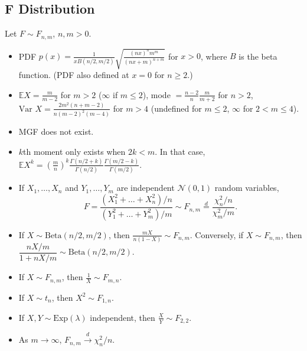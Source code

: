 \documentclass[twoside]{article}
\newcommand\bbE{\mathbb{E}}
\newcommand\calN{\mathcal{N}}
\newcommand\lmb{\lambda}
\newcommand\goesto{\rightarrow}
\newcommand\var{\text{Var }}
\begin{document}
\subsection{F Distribution}
Let $F \sim F_{n,m}$, $n, m > 0$.
\begin{itemize}
\item PDF $p(x) = \displaystyle\frac{1}{x B(n/2, m/2)} \sqrt{\displaystyle\frac{(nx)^n m^m}{(nx +m)^{n+m}}}$ for $x > 0$, where $B$ is the beta function. (PDF also defined at $x = 0$ for $n \geq 2$.)

\item $\bbE X = \displaystyle\frac{m}{m-2}$ for $m > 2$ ($\infty$ if $m \leq 2$), mode $= \displaystyle\frac{n-2}{n}\frac{m}{m+2}$ for $n > 2$, $\var X = \displaystyle\frac{2m^2(n+m-2)}{n(m-2)^2 (m-4)}$ for $m > 4$ (undefined for $m \leq 2$, $\infty$ for $2 < m \leq 4$).

\item MGF does not exist.

\item $k$th moment only exists when $2k < m$. In that case, $\bbE X^k = \left(\displaystyle\frac{m}{n}\right)^k \displaystyle\frac{\Gamma(n/2 + k)}{\Gamma(n/2)}\frac{\Gamma(m/2 - k)}{\Gamma(m/2)}$.

\item If $X_1, \dots, X_n$ and $Y_1, \dots, Y_m$ are independent $\calN(0,1)$ random variables,
\begin{equation*}
F = \frac{(X_1^2 + \dots + X_n^2)/n}{(Y_1^2 + \dots + Y_m^2)/m} \sim F_{n,m} \stackrel{d}{=} \frac{\chi_n^2 / n}{\chi_m^2 / m}.
\end{equation*}

\item If $X \sim \text{Beta}(n/2, m/2)$, then $\displaystyle\frac{mX}{n(1-X)} \sim F_{n,m}$. Conversely, if $X \sim F_{n,m}$, then $\dfrac{nX/m}{1+nX/m} \sim \text{Beta}(n/2, m/2)$.

\item If $X \sim F_{n,m}$, then $\displaystyle\frac{1}{X} \sim F_{m,n}$.

\item If $X \sim t_n$, then $X^2 \sim F_{1,n}$.

\item If $X, Y \sim \text{Exp}(\lmb)$ independent, then $\displaystyle\frac{X}{Y} \sim F_{2,2}$.

\item As $m \goesto \infty$, $F_{n,m} \stackrel{d}{\goesto} \chi_n^2/n$.
\end{itemize}
\end{document}
